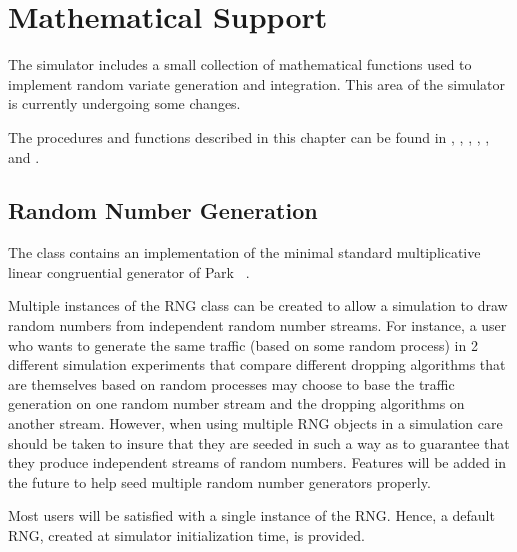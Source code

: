 %
%
\chapter{Mathematical Support}
\label{chap:math}

The simulator includes a small collection of mathematical
functions used to implement random variate generation and integration.
This area of the simulator is currently undergoing some
changes.

The procedures and functions described in this chapter can be found in
,
,
,
,
, and
.

\section{Random Number Generation}
\label{sec:random}

The  class contains an implementation of the minimal standard
multiplicative linear congruential generator of
Park \etal~\cite{Park88:Random}.

Multiple instances of the RNG class can be created to allow a
simulation to draw random numbers from independent random number
streams.  For instance, a user who wants to generate the same traffic
(based on some random process) in 2 different simulation experiments
that compare different dropping algorithms that are themselves based
on random processes may choose to base the traffic generation on one
random number stream and the dropping algorithms on another stream.
However, when using multiple RNG objects in a simulation care should
be taken to insure that they are seeded in such a way as to guarantee
that they produce independent streams of random numbers.  Features
will be added in the future to help seed multiple random number
generators properly.

Most users will be satisfied with a single instance of the RNG.
Hence, a default RNG, created at simulator initialization time, is
provided.

